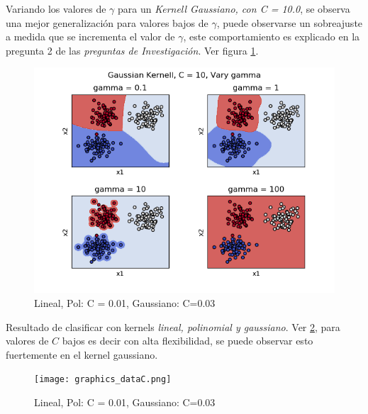 \documentclass{article}
\begin{document}
\begin{itemize}
    Variando los valores de $\gamma$ para un \textit{Kernell Gaussiano, con C = 10.0}, se observa una mejor
    generalización para valores bajos de $\gamma$, puede observarse un sobreajuste a medida que
    se incrementa el valor de $\gamma$, este comportamiento es explicado en la pregunta 2
    de las \textit{preguntas de Investigación}. Ver figura \ref{PLOT_G_V}.
    
    \begin{figure}[h]
        \label{PLOT_G_V}
        \centering
        \includegraphics[width=.6\textwidth]{variance_gamma.png}
        \caption{Lineal, Pol: C = 0.01, Gaussiano: C=0.03}
    \end{figure}


    Resultado de clasificar con kernels \textit{lineal, polinomial y gaussiano}. Ver \ref{PLOT4}, para valores de $C$ bajos
    es decir con alta flexibilidad, se puede observar esto fuertemente en el kernel gaussiano.
    \begin{figure}[h]
        \label{PLOT4}
        \centering
        \texttt{[image: graphics\_dataC.png]}
        \caption{Lineal, Pol: C = 0.01, Gaussiano: C=0.03}
    \end{figure}


\end{itemize}
\end{document}
